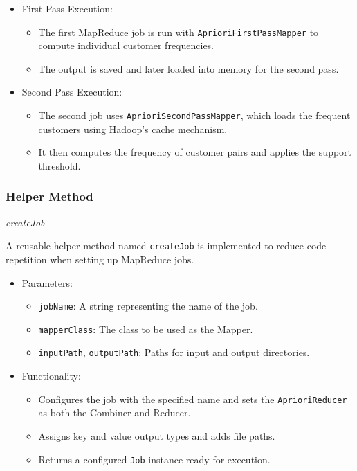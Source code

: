 \begin{itemize}
    \item First Pass Execution:
    \begin{itemize}
        \item The first MapReduce job is run with \texttt{AprioriFirstPassMapper} to compute individual customer frequencies.
        \item The output is saved and later loaded into memory for the second pass.
    \end{itemize}

    \item Second Pass Execution:
    \begin{itemize}
        \item The second job uses \texttt{AprioriSecondPassMapper}, which loads the frequent customers using Hadoop's cache mechanism.
        \item It then computes the frequency of customer pairs and applies the support threshold.
    \end{itemize}
\end{itemize}

\subsubsection{Helper Method} \textit{createJob}

A reusable helper method named \texttt{createJob} is implemented to reduce code repetition when setting up MapReduce jobs.

\begin{itemize}
    \item Parameters:
    \begin{itemize}
        \item \texttt{jobName}: A string representing the name of the job.
        \item \texttt{mapperClass}: The class to be used as the Mapper.
        \item \texttt{inputPath}, \texttt{outputPath}: Paths for input and output directories.
    \end{itemize}
    \item Functionality:
    \begin{itemize}
        \item Configures the job with the specified name and sets the \texttt{AprioriReducer} as both the Combiner and Reducer.
        \item Assigns key and value output types and adds file paths.
        \item Returns a configured \texttt{Job} instance ready for execution.
    \end{itemize}
\end{itemize}